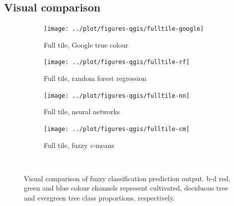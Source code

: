\documentclass[a4paper,12pt]{scrbook}
\begin{document}
\subsection{Visual comparison}

\begin{figure}
  \centering
  \begin{subfigure}[t]{.23\textwidth}
    \texttt{[image: ../plot/figures-qgis/fulltile-google]}
    \caption{Full tile, Google true colour}
  \end{subfigure} \hfill
  \begin{subfigure}[t]{.23\textwidth}
    \texttt{[image: ../plot/figures-qgis/fulltile-rf]}
    \caption{Full tile, random forest regression}
    \label{subfig-fulltile-rf}
  \end{subfigure} \hfill
  \begin{subfigure}[t]{.23\textwidth}
    \texttt{[image: ../plot/figures-qgis/fulltile-nn]}
    \caption{Full tile, neural networks}
  \end{subfigure} \hfill
  \begin{subfigure}[t]{.23\textwidth}
    \texttt{[image: ../plot/figures-qgis/fulltile-cm]}
    \caption{Full tile, fuzzy \textit{c}-means}
    \label{subfig-fulltile-cm}
  \end{subfigure} \
  \caption{Visual comparison of fuzzy classification prediction output. b-d red, green and blue colour channels represent cultivated, deciduous tree and evergreen tree class proportions, respectively.}
\end{figure}
\end{document}
